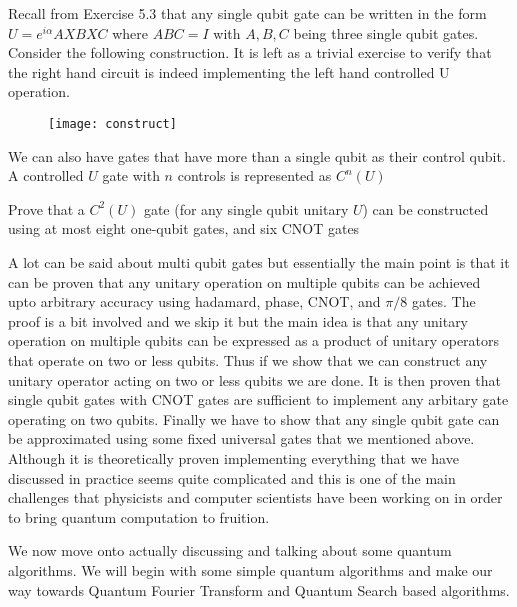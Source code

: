 Recall from Exercise 5.3 that any single qubit gate can be written in the form $U = e^{i\alpha}AXBXC$ where $ABC = I$ with $A, B, C$ being three single qubit gates.
Consider the following construction. It is left as a trivial exercise to verify that the right hand circuit is indeed implementing the left hand controlled U operation.

\begin{figure}[htp]
    \centering
    \texttt{[image: construct]}
\end{figure}

We can also have gates that have more than a single qubit as their control qubit. A controlled $U$ gate with $n$ controls is represented as $C^n(U)$

\begin{exercise}
Prove that a $C^2(U)$ gate (for any single qubit unitary $U$) can be
constructed using at most eight one-qubit gates, and six CNOT gates
\end{exercise}

A lot can be said about multi qubit gates but essentially the main point is that it can be proven that any unitary operation on multiple qubits can be achieved upto arbitrary accuracy using hadamard, phase, CNOT, and $\pi/8$ gates. The proof is a bit involved and we skip it but the main idea is that any unitary operation on multiple qubits can be expressed as a product of unitary operators that operate on two or less qubits. Thus if we show that we can construct any unitary operator acting on two or less qubits we are done. It is then proven that single qubit gates with CNOT gates are sufficient to implement any arbitary gate operating on two qubits. Finally we have to show that any single qubit gate can be approximated using some fixed universal gates that we mentioned above. Although it is theoretically proven implementing everything that we have discussed in practice seems quite complicated and this is one of the main challenges that physicists and computer scientists have been working on in order to bring quantum computation to fruition.

We now move onto actually discussing and talking about some quantum algorithms. We will begin with some simple quantum algorithms and make our way towards Quantum Fourier Transform and Quantum Search based algorithms.
\clearpage